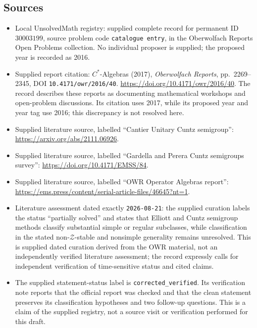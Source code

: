 \documentclass[11pt]{article}
\begin{document}
\subsection{Sources}
\begin{itemize}
\item Local UnsolvedMath registry: supplied complete record for permanent ID \(30003199\), source problem code \texttt{catalogue entry}, in the Oberwolfach Reports Open Problems collection. No individual proposer is supplied; the proposed year is recorded as 2016.
\item Supplied report citation: \(C^*\)-Algebras (2017), \emph{Oberwolfach Reports}, pp.\ 2269--2345, DOI \texttt{10.4171/owr/2016/40}. \url{https://doi.org/10.4171/owr/2016/40}. The record describes these reports as documenting mathematical workshops and open-problem discussions. Its citation uses 2017, while its proposed year and year tag use 2016; this discrepancy is not resolved here.
\item Supplied literature source, labelled ``Cantier Unitary Cuntz semigroup'': \url{https://arxiv.org/abs/2111.06926}.
\item Supplied literature source, labelled ``Gardella and Perera Cuntz semigroups survey'': \url{https://doi.org/10.4171/EMSS/84}.
\item Supplied literature source, labelled ``OWR Operator Algebras report'': \url{https://ems.press/content/serial-article-files/46645?nt=1}.
\item Literature assessment dated exactly \texttt{2026-08-21}: the supplied curation labels the status ``partially solved'' and states that Elliott and Cuntz semigroup methods classify substantial simple or regular subclasses, while classification in the stated non-\(\mathcal Z\)-stable and nonsimple generality remains unresolved. This is supplied dated curation derived from the OWR material, not an independently verified literature assessment; the record expressly calls for independent verification of time-sensitive status and cited claims.
\item The supplied statement-status label is \texttt{corrected\_verified}. Its verification note reports that the official report was checked and that the clean statement preserves its classification hypotheses and two follow-up questions. This is a claim of the supplied registry, not a source visit or verification performed for this draft.
\end{itemize}
\end{document}
